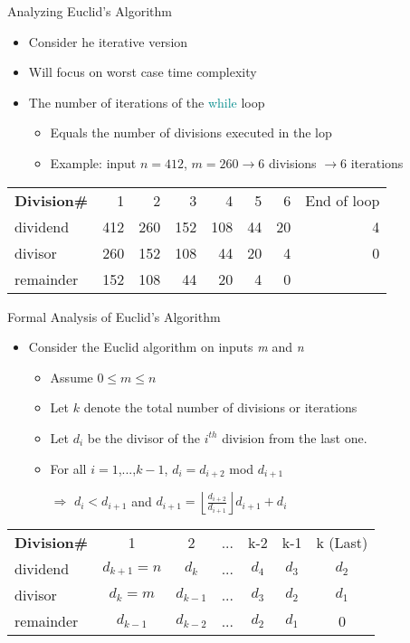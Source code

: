 \item Analyzing Euclid's Algorithm
  \begin{itemize}
  \item Consider he iterative version
  \item Will focus on worst case time complexity
  \item The number of iterations of the \textcolor{DarkCyan}{while} loop
    \begin{itemize}
    \item Equals the number of divisions executed in the lop
    \item Example: input $n=412$, $m=260\rightarrow6$ divisions $\rightarrow6$ iterations
    \end{itemize}
  \end{itemize}
  \begin{tabular}{l r r r r r r r}
  \rowcolor{LightCyan} \textbf{Division\#} & 1   & 2   & 3   & 4   & 5  & 6  & End of loop \\
  \rowcolor{DarkCyan} dividend            & 412 & 260 & 152 & 108 & 44 & 20 & 4 \\
  \rowcolor{LightCyan} divisor            & 260 & 152 & 108 & 44  & 20 & 4  & 0 \\
  \rowcolor{DarkCyan} remainder           & 152 & 108 & 44  & 20  & 4  & 0  &   \\
  \end{tabular}
\item Formal Analysis of Euclid's Algorithm
  \begin{itemize}
  \item Consider the Euclid algorithm on inputs \emph{m} and \emph{n}
    \begin{itemize}
    \item Assume $0\leq m\leq n$
    \item Let $k$ denote the total number of divisions or iterations
    \item Let $d_{i}$ be the divisor of the $i^{th}$ division from the last one.
    \item For all $i=1$,...,$k-1$, $d_{i}=d_{i+2}$ mod $d_{i+1}$
    \item [$\Rightarrow$] $d_{i} < d_{i+1}$ and $d_{i+1}=\left\lfloor\frac{d_{i+2}}{d_{i+1}}\right\rfloor d_{i+1}+d_{i}$
    \end{itemize}
  \end{itemize}
  \begin{tabular}{l c c c c c c}
  \rowcolor{LightCyan} \textbf{Division\#} & 1   & 2   & ...   & k-2   & k-1  & k (Last) \\
  \rowcolor{DarkCyan} dividend            & $d_{k+1}=n$ & $d_{k}$ & ... & $d_{4}$ & $d_{3}$ & $d_{2}$ \\
  \rowcolor{LightCyan} divisor            & $d_{k}=m$ & $d_{k-1}$ & ... & $d_{3}$  & $d_{2}$ & $d_{1}$ \\
  \rowcolor{DarkCyan} remainder           & $d_{k-1}$ & $d_{k-2}$ & ...  & $d_{2}$  & $d_{1}$  & 0 \\
  \end{tabular}
